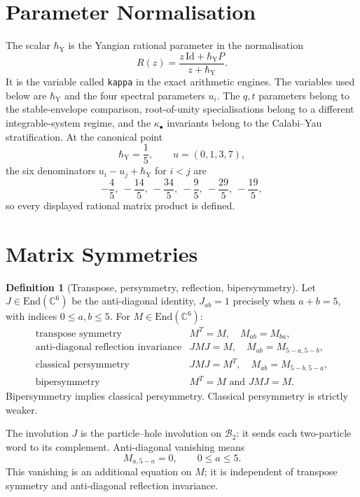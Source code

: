 \documentclass[11pt]{amsart}
\theoremstyle{definition}
\newtheorem{definition}[theorem]{Definition}
\theoremstyle{remark}
\newcommand{\End}{\mathrm{End}}
\newcommand{\C}{\mathbb{C}}
\begin{document}
\section{Parameter Normalisation}

The scalar $\hbar_{\mathrm{Y}}$ is the Yangian rational parameter in the
normalisation
\[
  R(z)=\frac{z\,\mathrm{Id}+\hbar_{\mathrm{Y}}P}{z+\hbar_{\mathrm{Y}}}.
\]
It is the variable called \texttt{kappa} in the exact arithmetic engines.
The variables used below are $\hbar_{\mathrm{Y}}$ and the four spectral
parameters $u_i$.  The $q,t$ parameters belong to the stable-envelope
comparison, root-of-unity specialisations belong to a different
integrable-system regime, and the $\kappa_\bullet$ invariants belong to
the Calabi--Yau stratification.  At the canonical point
\[
  \hbar_{\mathrm{Y}}=\frac15,\qquad u=(0,1,3,7),
\]
the six denominators $u_i-u_j+\hbar_{\mathrm{Y}}$ for $i<j$ are
\[
  -\frac45,\ -\frac{14}{5},\ -\frac{34}{5},\
  -\frac95,\ -\frac{29}{5},\ -\frac{19}{5},
\]
so every displayed rational matrix product is defined.

\section{Matrix Symmetries}

\begin{definition}[Transpose, persymmetry, reflection, bipersymmetry]
Let $J\in\End(\C^6)$ be the anti-diagonal identity,
$J_{ab}=1$ precisely when $a+b=5$, with indices
$0\leq a,b\leq 5$.
For $M\in\End(\C^6)$:
\[
\begin{array}{ll}
\text{transpose symmetry} & M^T=M,
  \quad M_{ab}=M_{ba},\\[2mm]
\text{anti-diagonal reflection invariance} & JMJ=M,
  \quad M_{ab}=M_{5-a,5-b},\\[2mm]
\text{classical persymmetry} & JMJ=M^T,
  \quad M_{ab}=M_{5-b,5-a},\\[2mm]
\text{bipersymmetry} & M^T=M \text{ and } JMJ=M.
\end{array}
\]
Bipersymmetry implies classical persymmetry.  Classical persymmetry is
strictly weaker.
\end{definition}

The involution $J$ is the particle--hole involution on
$\mathcal B_2$: it sends each two-particle word to its complement.
Anti-diagonal vanishing means
\[
  M_{a,5-a}=0,\qquad 0\leq a\leq 5.
\]
This vanishing is an additional equation on $M$; it is independent of
transpose symmetry and anti-diagonal reflection invariance.
\end{document}
